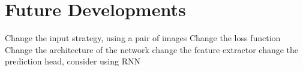 \section{Future Developments}\label{sec:future-developments}


Change the input strategy, using a pair of images
Change the loss function
Change the architecture of the network
        change the feature extractor
        change the prediction head, consider using RNN

